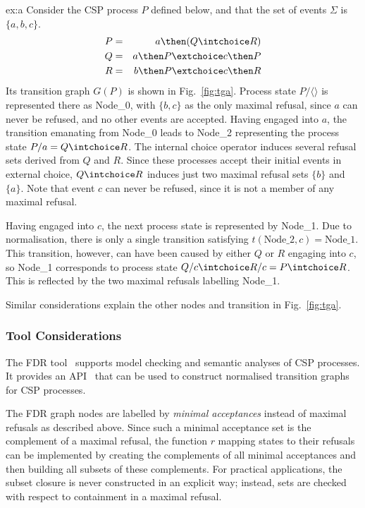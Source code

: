 \begin{example}{ex:a}
Consider the CSP process $P$ defined below, and that the set of events
$\Sigma$ is $\{a,b,c\}$.
\begin{eqnarray*}
P & = & a \then (Q\intchoice R)
\\
Q & = & a \then P \extchoice c \then P
\\
R & = & b \then P \extchoice c \then R
\end{eqnarray*}
Its transition graph $G(P)$ is shown in Fig.~\ref{fig:tga}. Process state
$P/\langle\rangle$ is represented there as Node\_0, with $\{ b,c\}$ as the
only maximal refusal, since $a$ can never be refused, and no other events are
accepted. Having engaged into $a$, the transition emanating from Node\_0
leads to Node\_2 representing  the process state $P/a = Q\intchoice R$. The
internal choice operator induces several refusal sets derived from $Q$ and
$R$. Since these processes accept their initial events in external choice,
$Q\intchoice R$ induces just two maximal refusal sets $\{b\}$ and
$\{a\}$. Note that event $c$ can never be refused, since it is not a member
of any maximal refusal.

Having engaged into $c$, the next process state is represented by Node\_1.
Due to normalisation, there is only a single transition satisfying
$t(\text{Node\_2},c) = \text{Node\_1}$. This transition, however, can have
been caused by either $Q$ or $R$ engaging into $c$, so Node\_1 corresponds to
process state $Q/c \intchoice R/c = P \intchoice R$. This is reflected by the
two maximal refusals labelling Node\_1. 

Similar considerations explain the other nodes and transition in
Fig.~\ref{fig:tga}.
\end{example}


\subsubsection*{Tool Considerations}
The FDR tool~\cite{fdr} supports model checking and semantic analyses of CSP
processes. It provides an API~\cite{fdrmanual} that can be used to construct
normalised transition graphs for CSP processes.

The FDR graph nodes are labelled by \emph{minimal acceptances} instead of
maximal refusals as described above. Since such a minimal acceptance set is
the complement of a maximal refusal, the function $r$ mapping states to their
refusals can be implemented by creating the complements of all minimal
acceptances and then building all subsets of these complements. For practical
applications, the subset closure is never constructed in an explicit way;
instead, sets are checked with respect to containment in a maximal refusal.

